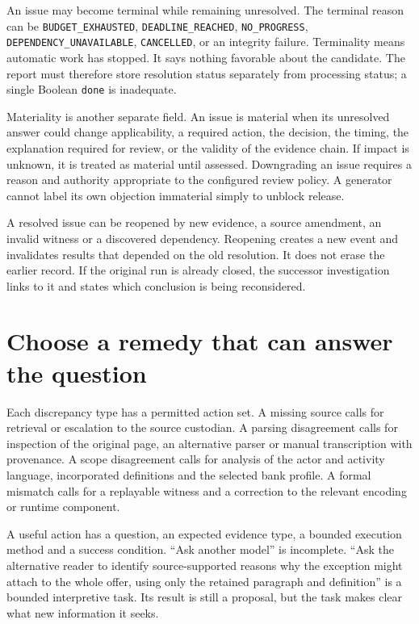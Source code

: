 \documentclass[12pt,a4paper,oneside,openany]{book}
\begin{document}
An issue may become terminal while remaining unresolved. The terminal reason can
be \texttt{BUDGET\_EXHAUSTED}, \texttt{DEADLINE\_REACHED}, \texttt{NO\_PROGRESS},
\texttt{DEPENDENCY\_UNAVAILABLE}, \texttt{CANCELLED}, or an integrity failure.
Terminality means automatic work has stopped. It says nothing favorable about
the candidate. The report must therefore store resolution status separately from
processing status; a single Boolean \texttt{done} is inadequate.

Materiality is another separate field. An issue is material when its unresolved
answer could change applicability, a required action, the decision, the timing,
the explanation required for review, or the validity of the evidence chain. If
impact is unknown, it is treated as material until assessed. Downgrading an issue
requires a reason and authority appropriate to the configured review policy.
A generator cannot label its own objection immaterial simply to unblock release.

A resolved issue can be reopened by new evidence, a source amendment, an invalid
witness or a discovered dependency. Reopening creates a new event and invalidates
results that depended on the old resolution. It does not erase the earlier
record. If the original run is already closed, the successor investigation links
to it and states which conclusion is being reconsidered.

\section{Choose a remedy that can answer the question}
\label{merge:M06:08}


Each discrepancy type has a permitted action set. A missing source calls for
retrieval or escalation to the source custodian. A parsing disagreement calls for
inspection of the original page, an alternative parser or manual transcription
with provenance. A scope disagreement calls for analysis of the actor and
activity language, incorporated definitions and the selected bank profile. A
formal mismatch calls for a replayable witness and a correction to the relevant
encoding or runtime component.

A useful action has a question, an expected evidence type, a bounded execution
method and a success condition. ``Ask another model'' is incomplete. ``Ask the
alternative reader to identify source-supported reasons why the exception might
attach to the whole offer, using only the retained paragraph and definition'' is
a bounded interpretive task. Its result is still a proposal, but the task makes
clear what new information it seeks.
\end{document}
